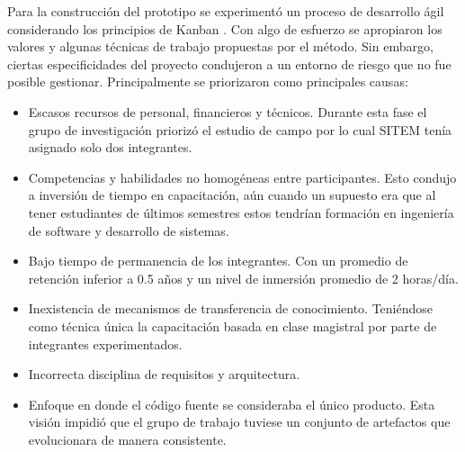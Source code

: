 Para la construcción del prototipo se experimentó un proceso de desarrollo ágil considerando los principios de Kanban \cite{anderson2016}. Con algo de esfuerzo se apropiaron los valores y algunas técnicas de trabajo propuestas por el método. Sin embargo, ciertas especificidades del proyecto condujeron a un entorno de riesgo que no fue posible gestionar. Principalmente se priorizaron como principales causas:

\begin{itemize}
  \item Escasos recursos de personal, financieros y técnicos. Durante esta fase el grupo de investigación priorizó el estudio de campo por lo cual SITEM tenía asignado solo dos integrantes.
  \item Competencias y habilidades no homogéneas entre participantes. Esto condujo a inversión de tiempo en capacitación, aún cuando un supuesto era que al tener estudiantes de últimos semestres estos tendrían formación en ingeniería de software y desarrollo de sistemas.  
  \item Bajo tiempo de permanencia de los integrantes. Con un promedio de retención inferior a 0.5 años y un nivel de inmersión promedio de 2 horas/día.
  \item Inexistencia de mecanismos de transferencia de conocimiento. Teniéndose como técnica única la capacitación basada en clase magistral por parte de integrantes experimentados.
  \item Incorrecta disciplina de requisitos y arquitectura.
  \item Enfoque en donde el código fuente se consideraba el único producto. Esta visión impidió que el grupo de trabajo tuviese un conjunto de artefactos que evolucionara de manera consistente. 
\end{itemize}

